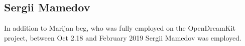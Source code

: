\documentclass{deliverablereport}
\begin{document}
\subsection{Sergii Mamedov}

In addition to Marijan beg, who was fully employed on the OpenDreamKit project, between Oct 2.18 and February 2019 Sergii Mamedov was employed.

\end{document}
